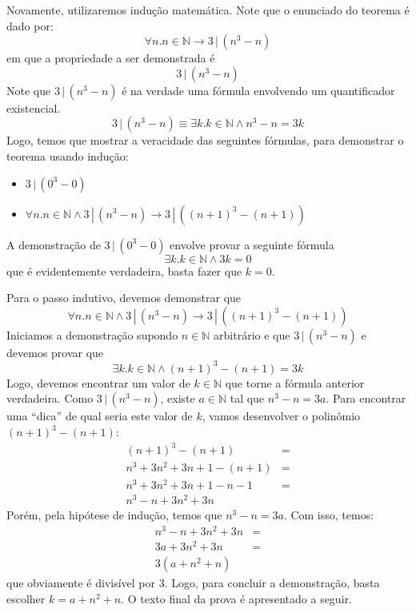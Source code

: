 \begin{Commentary}
Novamente, utilizaremos indução matemática. Note que o enunciado do
teorema é dado por:
\[
\forall n. n\in\mathbb{N} \to 3\,|\,(n^3 - n)
\]
em que a propriedade a ser demonstrada é
\[
3\,|\,(n^3 - n)
\]
Note que $3\,|\,(n^3 - n)$ é na verdade uma fórmula envolvendo um
quantificador existencial.
\[
3\,|\,(n^3 - n) \equiv \exists k. k\in\mathbb{N}\land n^3 - n = 3k
\]
Logo, temos que mostrar a veracidade das seguintes fórmulas, para
demonstrar o teorema usando indução:
\begin{itemize}
  \item $3\,|\,(0^3 - 0)$
  \item $\forall n. n\in\mathbb{N}\land 3\,|\,(n^3 - n)\to
    3\,|\,((n+1)^3 - (n + 1))$
\end{itemize}
A demonstração de $3\,|\,(0^3 - 0)$ envolve provar a seguinte fórmula
\[
\exists k. k\in\mathbb{N}\land 3k = 0
\]
que é evidentemente verdadeira, basta fazer que $k = 0$.

Para o passo indutivo, devemos demonstrar que
\[\forall n. n\in\mathbb{N}\land 3\,|\,(n^3 - n)\to
    3\,|\,((n+1)^3 - (n + 1))\]
Iniciamos a demonstração supondo $n\in\mathbb{N}$ arbitrário e que
$3\,|\,(n^3 - n)$ e devemos provar que
\[
\exists k. k\in\mathbb{N}\land (n + 1)^3 - (n+1) = 3k
\]
Logo, devemos encontrar um valor de $k\in\mathbb{N}$ que torne a
fórmula anterior verdadeira. Como $3\,|\,(n^3 - n)$, existe $a \in
\mathbb{N}$ tal que $n^3 - n = 3a$. Para encontrar uma ``dica'' de
qual seria este valor de $k$, vamos desenvolver o polinômio $(n+1)^3 -
(n + 1)$:
\[
\begin{array}{lc}
(n+1)^3 - (n + 1) & =\\
n^3 + 3n^2 + 3n + 1 - (n + 1) & = \\
n^3 + 3n^2 + 3n + 1 - n - 1 & = \\
n^3 -n + 3n^2 + 3n
\end{array}
\]
Porém, pela hipótese de indução, temos que $n^3 - n = 3a$. Com isso,
temos:
\[
\begin{array}{lc}
n^3 -n + 3n^2 + 3n & =\\
3a + 3n^2 + 3n & = \\
3 (a + n^2 + n)
\end{array}
\]
que obviamente é divisível por $3$. Logo, para concluir a
demonstração, basta escolher $k = a + n^2 + n$. O texto final da prova
é apresentado a seguir.
\end{Commentary}
